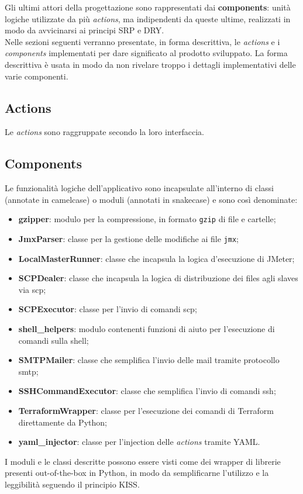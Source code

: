 Gli ultimi attori della progettazione sono rappresentati dai \textbf{components}: unità logiche utilizzate da più \textit{actions}, ma indipendenti da queste ultime, realizzati in modo da avvicinarsi ai principi SRP e DRY.\\
Nelle sezioni seguenti verranno presentate, in forma descrittiva, le \textit{actions} e i \textit{components} implementati per dare significato al prodotto sviluppato. La forma descrittiva è usata in modo da non rivelare troppo i dettagli implementativi delle varie componenti.
\subsection{Actions}
Le \textit{actions} sono raggruppate secondo la loro interfaccia.

\subsection{Components}
Le funzionalità logiche dell'applicativo sono incapsulate all'interno di classi (annotate in \gls{camelcase}) o moduli (annotati in \gls{snakecase}) e sono così denominate:
\begin{itemize}
	\item \textbf{gzipper}: modulo per la compressione, in formato \texttt{gzip} di file e cartelle;
	\item \textbf{JmxParser}: classe per la gestione delle modifiche ai file \texttt{jmx};
	\item \textbf{LocalMasterRunner}: classe che incapsula la logica d'esecuzione di JMeter;
	\item \textbf{SCPDealer}: classe che incapsula la logica di distribuzione dei files agli slaves via \gls{scp};
	\item \textbf{SCPExecutor}: classe per l'invio di comandi \gls{scp};
	\item \textbf{shell\_helpers}: modulo contenenti funzioni di aiuto per l'esecuzione di comandi sulla \gls{shell};
	\item \textbf{SMTPMailer}: classe che semplifica l'invio delle mail tramite protocollo \gls{smtp};
	\item \textbf{SSHCommandExecutor}: classe che semplifica l'invio di comandi \gls{ssh};
	\item \textbf{TerraformWrapper}: classe per l'esecuzione dei comandi di Terraform direttamente da Python;
	\item \textbf{yaml\_injector}: classe per l'injection delle \textit{actions} tramite YAML.
\end{itemize}
I moduli e le classi descritte possono essere visti come dei \gls{wrapper} di librerie presenti \gls{out-of-the-box} in Python, in modo da semplificarne l'utilizzo e la leggibilità seguendo il principio KISS.
